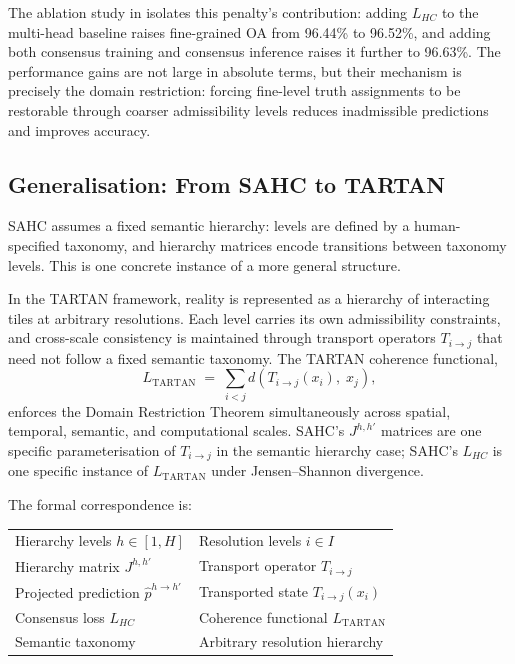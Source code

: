 \documentclass[12pt, oneside]{article}
\theoremstyle{plain}
\theoremstyle{definition}
\theoremstyle{remark}
\begin{document}
The ablation study in \cite{Weikmann2026} isolates this
penalty's contribution: adding $L_{HC}$ to the multi-head
baseline raises fine-grained OA from 96.44\% to 96.52\%,
and adding both consensus training and consensus inference
raises it further to 96.63\%.
The performance gains are not large in absolute terms, but
their mechanism is precisely the domain restriction: forcing
fine-level truth assignments to be restorable through coarser
admissibility levels reduces inadmissible predictions and
improves accuracy.

\subsection{Generalisation: From SAHC to TARTAN}

SAHC assumes a fixed semantic hierarchy: levels are
defined by a human-specified taxonomy, and hierarchy
matrices encode transitions between taxonomy levels.
This is one concrete instance of a more general structure.

In the TARTAN framework, reality is represented as a
hierarchy of interacting tiles at arbitrary resolutions.
Each level carries its own admissibility constraints, and
cross-scale consistency is maintained through transport
operators $T_{i \to j}$ that need not follow a fixed semantic
taxonomy.
The TARTAN coherence functional,
\[
  L_{\mathrm{TARTAN}}
  \;=\;
  \sum_{i < j}
  d\!\left(
    T_{i \to j}(x_i),\; x_j
  \right),
\]
enforces the Domain Restriction Theorem simultaneously
across spatial, temporal, semantic, and computational scales.
SAHC's $J^{h,h'}$ matrices are one specific parameterisation
of $T_{i \to j}$ in the semantic hierarchy case;
SAHC's $L_{HC}$ is one specific instance of $L_{\mathrm{TARTAN}}$
under Jensen--Shannon divergence.

The formal correspondence is:

\begin{center}
\renewcommand{\arraystretch}{1.4}
\begin{tabular}{l@{\quad$\longleftrightarrow$\quad}l}
  Hierarchy levels $h \in [1, H]$ & Resolution levels $i \in I$ \\
  Hierarchy matrix $J^{h,h'}$ & Transport operator $T_{i \to j}$ \\
  Projected prediction $\hat{p}^{h \to h'}$ & Transported state $T_{i \to j}(x_i)$ \\
  Consensus loss $L_{HC}$ & Coherence functional $L_{\mathrm{TARTAN}}$ \\
  Semantic taxonomy & Arbitrary resolution hierarchy \\
\end{tabular}
\end{center}
\end{document}

